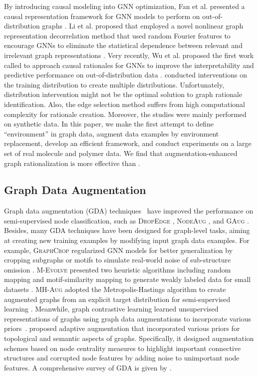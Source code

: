 \documentclass[sigconf]{acmart}
\begin{document}
By introducing causal modeling into GNN optimization, Fan et al. presented a causal representation framework for GNN models to perform on out-of-distribution graphs \cite{fan2021generalizing}. Li et al. proposed \oodgnn that employed a novel nonlinear graph representation decorrelation method that used random Fourier features to encourage GNNs to eliminate the statistical dependence between relevant and irrelevant graph representations \cite{li2021ood}.
Very recently, Wu et al. proposed the first work called \dir to approach causal rationales for GNNs to improve the interpretability and predictive performance on out-of-distribution data \cite{wu2022discovering}. \dir conducted interventions on the training distribution to create multiple distributions. Unfortunately, distribution intervention might not be the optimal solution to graph rationale identification. Also, the edge selection method suffers from high computational complexity for rationale creation. Moreover, the studies were mainly performed on synthetic data.
In this paper, we make the first attempt to define ``environment'' in graph data, augment data examples by environment replacement, develop an efficient framework, and conduct experiments on a large set of real molecule and polymer data. We find that augmentation-enhanced graph rationalization is more effective than \dir.

\subsection{Graph Data Augmentation}

Graph data augmentation (GDA) techniques~\cite{zhao2022graph,zhao2021counterfactual,zhao2021action,chen2020measuring} have improved the performance on semi-supervised node classification, such as \textsc{DropEdge} \cite{rong2019dropedge}, \textsc{NodeAug} \cite{wang2020nodeaug}, and \textsc{GAug} \cite{zhao2021data}.
Besides, many GDA techniques have been designed for graph-level tasks, aiming at creating new training examples by modifying input graph data examples. For example, \textsc{GraphCrop} regularized GNN models for better generalization by cropping subgraphs or motifs to simulate real-world noise of sub-structure omission \cite{wang2020graphcrop}.
\textsc{M-Evolve} presented two heuristic algorithms including random mapping and motif-similarity mapping to generate weakly labeled data for small datasets \cite{zhou2020data}.
\textsc{MH-Aug} adopted the Metropolis-Hastings algorithm to create augmented graphs from an explicit target distribution for semi-supervised learning \cite{park2021metropolis}.
Meanwhile, graph contrastive learning learned unsupervised representations of graphs using graph data augmentations to incorporate various priors~\cite{you2020graph}. \citet{zhu2021graph} proposed adaptive augmentation that incorporated various priors for topological and semantic aspects of graphs. Specifically, it designed augmentation schemes based on node centrality measures to highlight important connective structures and corrupted node features by adding noise to unimportant node features. A comprehensive survey of GDA is given by \citet{zhao2022graph}.
\end{document}
